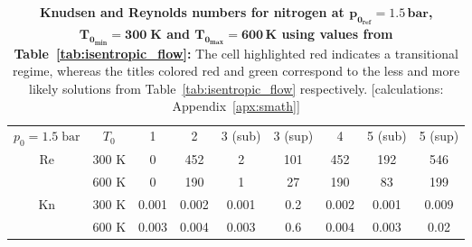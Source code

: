 \begin{table}[H]
    \centering
    \renewcommand{\arraystretch}{1.2}
    \begin{tabular}{|c|c||c|c|c|c|c|c|c|}
    \hline
    \multirow{2}{*}{\small $p_0 = 1.5\;\text{bar}$} 
        & \multirow{2}{*}{$T_0$} 
        & \multirow{2}{*}{1} 
        & \multirow{2}{*}{2} 
        & \multirow{2}{*}{\color{greenColor} 3 (sub)} 
        & \multirow{2}{*}{\color{redColor} 3 (sup)} 
        & \multirow{2}{*}{4} 
        & \multirow{2}{*}{\color{redColor} 5 (sub)} 
        & \multirow{2}{*}{\color{greenColor} 5 (sup)} \\
    & & & & & & & & \\ \hline \hline

    \multirow{2}{*}{Re} 
      & 300 K 
          & 0 
          & 452
          & 2
          & 101
          & 452
          & 192
          & 546 \\ \cline{2-9}
      & 600 K 
          & 0
          & 190
          & 1 
          & 27
          & 190
          & 83
          & 199 \\ \hline

    \multirow{2}{*}{Kn} 
      & 300 K 
          & 0.001 
          & 0.002
          & 0.001
          & \cellcolor[HTML]{FFADA8} 0.2 
          & 0.002
          & 0.001
          & 0.009 \\ \cline{2-9}
      & 600 K 
          & 0.003 
          & 0.004
          & 0.003
          & \cellcolor[HTML]{FFADA8} 0.6
          & 0.004
          & 0.003
          & 0.02 \\ \hline
    \end{tabular}
    \caption[Knudsen and Reynolds numbers for $p_{0_{ref}} = 1.5\,\mathrm{bar}$, $T_{0_{min}} = 300 \text{K}$ and $T_{0_{max}} 600\,\mathrm{K}$ using values from table~\ref{tab:isentropic_flow}.]{
        \textbf{\textbf{Knudsen and Reynolds numbers for nitrogen at $\mathbf{p_{0_{ref}} = 1.5\,\text{bar}}$, $\mathbf{T_{0_{min}} = 300\;\text{K}}$ and $\mathbf{T_{0_{max}} = 600\,\text{K}}$ using values from Table~\ref{tab:isentropic_flow}:}}
        The cell highlighted red indicates a transitional regime, whereas the titles colored red and green correspond to the less and more likely solutions from Table~\ref{tab:isentropic_flow} respectively.
        [calculations: Appendix~\ref{apx:smath}]
    }
    \label{tab:test-knudsen-reynolds-isentropic}
\end{table}
